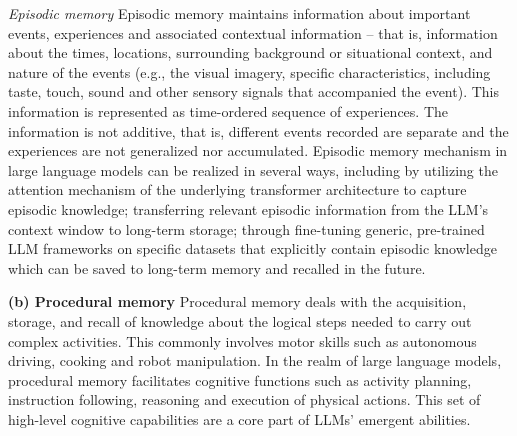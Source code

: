 \documentclass[10pt,journal,compsoc]{IEEEtran}
\begin{document}
	\textit{Episodic memory}
	Episodic memory maintains information about important events, experiences and associated contextual information \cite{tulving1972episodic} – that is, information about the times, locations, surrounding background or situational context, and nature of the events (e.g., the visual imagery, specific characteristics, including taste, touch, sound and other sensory signals that accompanied the event). This information is represented as time-ordered sequence of experiences. The information is not additive, that is, different events recorded are separate and the experiences are not generalized  nor accumulated. 
	Episodic memory mechanism in large language models can be realized in several ways, including by utilizing the attention mechanism of the underlying transformer architecture to capture episodic knowledge; transferring relevant episodic information from the LLM’s context window to long-term storage; through fine-tuning generic, pre-trained LLM frameworks on specific datasets that explicitly contain episodic knowledge which can be saved to long-term memory and recalled in the future. 
	
	
	
	\textbf{(b) Procedural memory}
	Procedural memory deals with the acquisition, storage, and recall of knowledge about the logical steps needed to carry out complex activities. This commonly involves motor skills such as autonomous driving, cooking and robot manipulation. In the realm of large language models, procedural memory facilitates cognitive functions such as activity planning, instruction following, reasoning and execution of physical actions. This set of high-level cognitive capabilities are a core part of LLMs’ emergent abilities.
	
\end{document}
